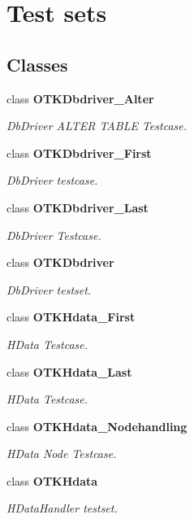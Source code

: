 \section{Test sets}
\label{group__OTK__TESTSETS}
\subsection*{Classes}
\begin{DoxyCompactItemize}
\item 
class {\bf OTKDbdriver\_\-Alter}
\begin{DoxyCompactList}\small\item\em DbDriver ALTER TABLE Testcase. \end{DoxyCompactList}\item 
class {\bf OTKDbdriver\_\-First}
\begin{DoxyCompactList}\small\item\em DbDriver testcase. \end{DoxyCompactList}\item 
class {\bf OTKDbdriver\_\-Last}
\begin{DoxyCompactList}\small\item\em DbDriver Testcase. \end{DoxyCompactList}\item 
class {\bf OTKDbdriver}
\begin{DoxyCompactList}\small\item\em DbDriver testset. \end{DoxyCompactList}\item 
class {\bf OTKHdata\_\-First}
\begin{DoxyCompactList}\small\item\em HData Testcase. \end{DoxyCompactList}\item 
class {\bf OTKHdata\_\-Last}
\begin{DoxyCompactList}\small\item\em HData Testcase. \end{DoxyCompactList}\item 
class {\bf OTKHdata\_\-Nodehandling}
\begin{DoxyCompactList}\small\item\em HData Node Testcase. \end{DoxyCompactList}\item 
class {\bf OTKHdata}
\begin{DoxyCompactList}\small\item\em HDataHandler testset. \end{DoxyCompactList}\item 

\end{DoxyCompactItemize}
